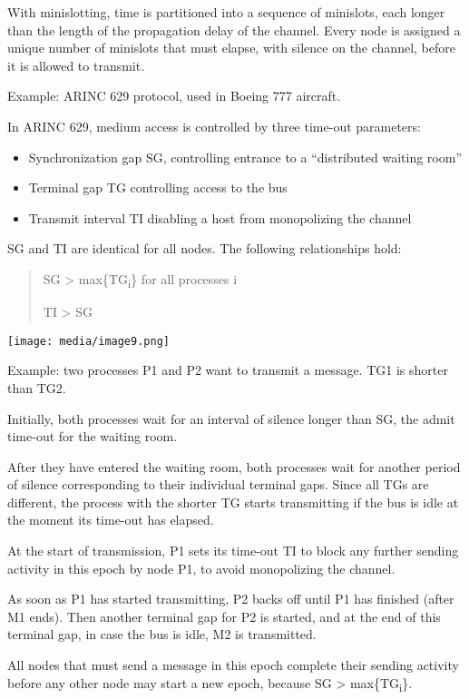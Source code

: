 With minislotting, time is partitioned into a sequence of minislots,
each longer than the length of the propagation delay of the channel.
Every node is assigned a unique number of minislots that must elapse,
with silence on the channel, before it is allowed to transmit.

Example: ARINC 629 protocol, used in Boeing 777 aircraft.

In ARINC 629, medium access is controlled by three time-out parameters:

\begin{itemize}
\item
  Synchronization gap SG, controlling entrance to a ``distributed
  waiting room''
\item
  Terminal gap TG controlling access to the bus
\item
  Transmit interval TI disabling a host from monopolizing the channel
\end{itemize}

SG and TI are identical for all nodes. The following relationships hold:

\begin{quote}
SG \textgreater{} max\{TG\textsubscript{i}\} for all processes i

TI \textgreater{} SG
\end{quote}

\texttt{[image: media/image9.png]}

Example: two processes P1 and P2 want to transmit a message. TG1 is
shorter than TG2.

Initially, both processes wait for an interval of silence longer than
SG, the admit time-out for the waiting room.

After they have entered the waiting room, both processes wait for
another period of silence corresponding to their individual terminal
gaps. Since all TGs are different, the process with the shorter TG
starts transmitting if the bus is idle at the moment its time-out has
elapsed.

At the start of transmission, P1 sets its time-out TI to block any
further sending activity in this epoch by node P1, to avoid monopolizing
the channel.

As soon as P1 has started transmitting, P2 backs off until P1 has
finished (after M1 ends). Then another terminal gap for P2 is started,
and at the end of this terminal gap, in case the bus is idle, M2 is
transmitted.

All nodes that must send a message in this epoch complete their sending
activity before any other node may start a new epoch, because SG
\textgreater{} max\{TG\textsubscript{i}\}.

